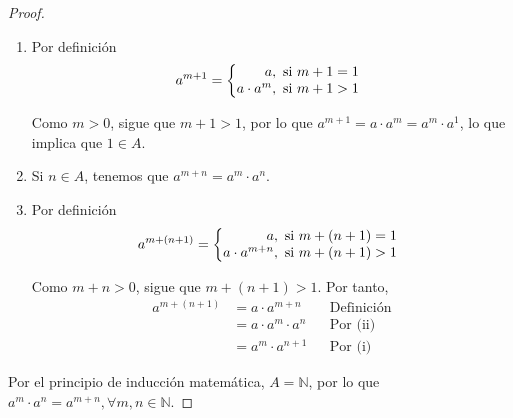 \documentclass[11pt]{article}
\newcommand{\N}{\mathbb{N}}
\begin{document}
\begin{enumerate}[label=\alph*)]
\begin{proof}
    \vspace{-1em}\begin{enumerate}[label=\roman*)]
    \item Por definición \vspace{1em}\begin{align*}
        a^{m+1} = \left\{
            \begin{array}{@{}r@{\thinspace}l}
                a, &  \ \text{si}  \ m+1 = 1\\
                a\cdot a^{m}, &  \ \text{si}  \ m+1 > 1
            \end{array} \right.
        \end{align*}\vspace{-1em}
        
        Como $m>0$, sigue que $m+1>1$, por lo que $a^{m+1}=a\cdot a^m=a^m\cdot a^1$, lo que implica que $1\in A$.
    \item Si $n\in A$, tenemos que $a^{m+n}=a^m\cdot a^n$.
    \item Por definición \vspace{1em}\begin{align*}
        a^{m+(n+1)} = \left\{
            \begin{array}{@{}r@{\thinspace}l}
                a, &  \ \text{si}  \ m+(n+1) = 1\\
                a\cdot a^{m+n}, &  \ \text{si}  \ m+(n+1) > 1
            \end{array} \right.
        \end{align*}\vspace{-1em}

    Como $m+n>0$, sigue que $m+(n+1)>1$. Por tanto, \vspace{1em}\begin{align*}
        a^{m+(n+1)} &=a\cdot a^{m+n} && \text{Definición}\\
        &= a\cdot a^m \cdot a^n && \text{Por (ii)}\\
        &= a^m \cdot a^{n+1} && \text{Por (i)}
    \end{align*}\vspace{-1em}
    \end{enumerate}\vspace{-1em}

    Por el principio de inducción matemática, $A=\N$, por lo que $a^m \cdot a^n = a^{m+n}, \forall m,n\in \N$.
    \end{proof} \vspace{-1em}


\end{enumerate}
\end{document}
